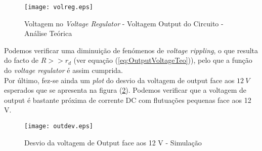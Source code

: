 \begin{figure}[H] \centering
  \texttt{[image: volreg.eps]}
  \caption{Voltagem no \emph{Voltage Regulator} - Voltagem Output do Circuito - Análise Teórica}
  \label{fig:TeoVoltageRegulator}
\end{figure}

Podemos verificar uma diminuição de fenómenos de \emph{voltage rippling}, o que resulta do facto de $R >> r_d$ (ver equação (\ref{eq:OutputVoltageTeo})), pelo que a função
do \emph{voltage regulator} é assim cumprida.
\\
Por último, fez-se ainda um \emph{plot} do desvio da voltagem de output face aos $12 \: V$ esperados que se apresenta na figura (\ref{fig:TeoDeviation}).
Podemos verificar que a voltagem de output é bastante próxima de corrente DC com flutuações pequenas face aos 12 V.

\begin{figure}[H] \centering
  \texttt{[image: outdev.eps]}
  \caption{Desvio da voltagem de Output face aos 12 V - Simulação}
  \label{fig:TeoDeviation}
\end{figure}